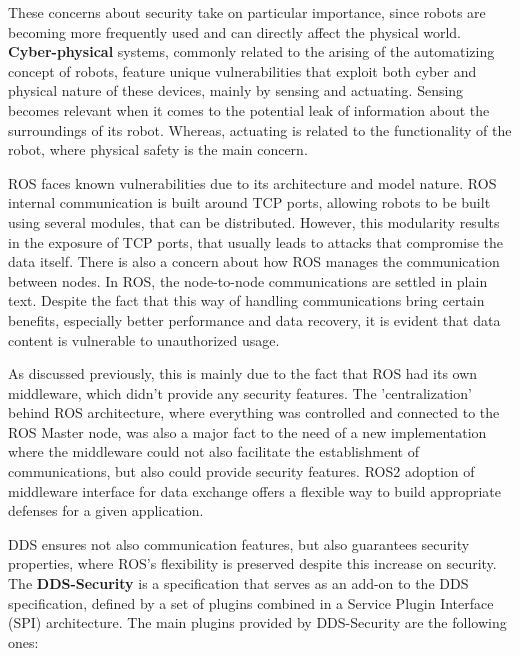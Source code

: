 These concerns about security take on particular importance, since robots are becoming more frequently used and can directly affect the physical world. \textbf{Cyber-physical} systems, commonly related to the arising of the automatizing concept of robots, feature unique vulnerabilities that exploit both cyber and physical nature of these devices, mainly by sensing and actuating. Sensing becomes relevant when it comes to the potential leak of information about the surroundings of its robot. Whereas, actuating is related to the functionality of the robot, where physical safety is the main concern.\cite{8794451, mcclean2013preliminary} %

ROS faces known vulnerabilities due to its architecture and model nature. ROS internal communication is built around TCP ports, allowing robots to be built using several modules, that can be distributed. However, this modularity results in the exposure of TCP ports, that usually leads to attacks that compromise the data itself.
There is also a concern about how ROS manages the communication between nodes. In ROS, the node-to-node communications are settled in plain text. Despite the fact that this way of handling communications bring certain benefits, especially better performance and data recovery, it is evident that data content is vulnerable to unauthorized usage.

As discussed previously, this is mainly due to the fact that ROS had its own middleware, which didn't provide any security features. The 'centralization' behind ROS architecture, where everything was controlled and connected to the ROS Master node, was also a major fact to the need of a new implementation where the middleware could not also facilitate the establishment of communications, but also could provide security features. ROS2 adoption of middleware interface for data exchange offers a flexible way to build appropriate defenses for a given application.

DDS ensures not also communication features, but also guarantees security properties, where ROS's flexibility is preserved despite this increase on security. The \textbf{DDS-Security} is a specification that serves as an add-on to the DDS specification, defined by a set of plugins combined in a Service Plugin Interface (SPI) architecture. The main plugins provided by DDS-Security are the following ones:
            
